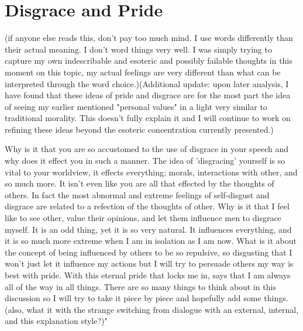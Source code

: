 \section{Disgrace and Pride}
(if anyone else reads this, don't pay too much mind. I use words differently than their actual meaning. I don't word things very well. I was simply trying to capture my own indescribable and esoteric and possibly failable thoughts in this moment on this topic, my actual feelings are very different than what can be interpreted through the word choice.)(Additional update: upon later analysis, I have found that these ideas of pride and disgrace are for the most part the idea of seeing my earlier mentioned "personal values" in a light very similar to traditional morality. This doesn't fully explain it and I will continue to work on refining these ideas beyond the esoteric concentration currently presented.)
\par Why is it that you are so accustomed to the use of disgrace in your speech and why does it effect you in such a manner. The idea of 'disgracing' yourself is so vital to your worldview, it effects everything; morals, interactions with other, and so much more. It isn't even like you are all that effected by the thoughts of others. In fact the most abnormal and extreme feelings of self-disgust and disgrace are related to a refection of the thoughts of other. Why is it that I feel like to see other, value their opinions, and let them influence men to disgrace myself. It is an odd thing, yet it is so very natural. It influences everything, and it is so much more extreme when I am in isolation as I am now. What is it about the concept of being influenced by others to be so repulsive, so disgusting that I won't just let it influence my actions but I will try to persuade others my way is best with pride. With this eternal pride that locks me in, says that I am always all of the way in all things. There are so many things to think about in this discussion so I will try to take it piece by piece and hopefully add some things.(also, what it with the strange switching from dialogue with an external, internal, and this explanation style?)"

